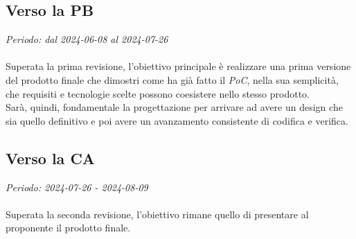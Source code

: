\subsection{Verso la PB}
\textit{Periodo: dal 2024-06-08 al 2024-07-26}
\\\\
Superata la prima revisione, l'obiettivo principale è realizzare una prima versione del prodotto finale che dimostri come ha già fatto il \textit{PoC}, nella sua semplicità, 
che requisiti e tecnologie scelte possono coesistere nello stesso prodotto. 
\\
Sarà, quindi, fondamentale la progettazione per arrivare ad avere un design che sia quello definitivo e poi avere un avanzamento consistente di codifica e verifica.

\subsection{Verso la CA}
\textit{Periodo: 2024-07-26 - 2024-08-09}
\\\\
Superata la seconda revisione, l'obiettivo rimane quello di presentare al proponente il prodotto finale.